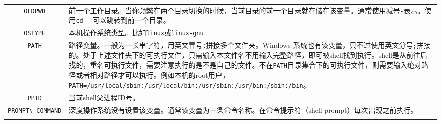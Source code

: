 \documentclass[doctor,openright,twoside]{sjtuthesis}
\newcommand{\passthrough}[1]{#1}
\theoremstyle{plain}
\theoremstyle{definition}
\theoremstyle{remark}
\theoremstyle{ocrenumbox}
\theoremstyle{plain}
\begin{document}
\begin{longtable}[]{@{}cl@{}}
\begin{minipage}[t]{0.23\columnwidth}
\passthrough{\lstinline!OLDPWD!}\strut
\end{minipage} & \begin{minipage}[t]{0.72\columnwidth}\raggedright
前一个工作目录。当你频繁在两个目录切换的时候，当前目录的前一个目录就存储在该变量。通常使用减号\passthrough{\lstinline!-!}表示。使用\passthrough{\lstinline!cd -!} 可以跳转到前一个目录。\strut
\end{minipage}\tabularnewline
\begin{minipage}[t]{0.23\columnwidth}\centering
\passthrough{\lstinline!OSTYPE!}\strut
\end{minipage} & \begin{minipage}[t]{0.72\columnwidth}\raggedright
本机操作系统类型。比如\passthrough{\lstinline!linux!}或\passthrough{\lstinline!linux-gnu!}\strut
\end{minipage}\tabularnewline
\begin{minipage}[t]{0.23\columnwidth}\centering
\passthrough{\lstinline!PATH!}\strut
\end{minipage} & \begin{minipage}[t]{0.72\columnwidth}\raggedright
路径变量。一般为一长串字符，用英文冒号\passthrough{\lstinline!:!}拼接多个文件夹。Windows 系统也有该变量，只不过使用英文分号\passthrough{\lstinline!;!}拼接的。处于上述文件夹下的可执行文件，只需输入本文件名不用输入完整路径，即可被shell找到执行。shell是从前往后找的，重名可执行文件，需要注意执行的是不是自己的文件。不在\passthrough{\lstinline!PATH!}目录集合下的可执行文件，则需要输入绝对路径或者相对路径才可以执行。例如本机的root用户，\passthrough{\lstinline!PATH=/usr/local/sbin:/usr/local/bin:/usr/sbin:/usr/bin:/sbin:/bin!}。\strut
\end{minipage}\tabularnewline
\begin{minipage}[t]{0.23\columnwidth}\centering
\passthrough{\lstinline!PPID!}\strut
\end{minipage} & \begin{minipage}[t]{0.72\columnwidth}\raggedright
当前shell父进程ID号。\strut
\end{minipage}\tabularnewline
\begin{minipage}[t]{0.23\columnwidth}\centering
\passthrough{\lstinline!PROMPT\_COMMAND!}\strut
\end{minipage} & \begin{minipage}[t]{0.72\columnwidth}\raggedright
深度操作系统没有设置该变量。通常该变量为一条命令名称。在命令提示符（shell prompt）每次出现之前执行。\strut
\end{minipage}\tabularnewline
\begin{minipage}[t]{0.23\columnwidth}\centering

\end{minipage}
\end{longtable}
\end{document}
